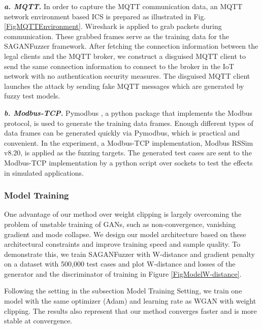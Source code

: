 \quad \textit{\textbf{a. MQTT.}}
In order to capture the MQTT communication data, an MQTT network environment based ICS is prepared as illustrated in Fig. \ref{FigMQTTEnvironment}. Wireshark \cite{orebaugh2006wireshark} is applied to grab packets during communication. These grabbed frames serve as the training data for the SAGANFuzzer framework. 
After fetching the connection information between the legal clients and the MQTT broker, we construct a disguised MQTT client to send the same connection information to connect to the broker in the IoT network with no authentication security measures. The disguised MQTT client launches the attack by sending fake MQTT messages which are generated by fuzzy test models. 

\quad \textit{\textbf{b. Modbus-TCP.}}
Pymodbus \cite{collins2013pymodbus}, a python package that implements the Modbus protocol, is used to generate the training data frames. Enough different types of data frames can be generated quickly via Pymodbus, which is practical and convenient. In the experiment, a Modbus-TCP implementation, Modbus RSSim v8.20, is applied as the fuzzing targets. The generated test cases are sent to the Modbus-TCP implementation by a python script over sockets to test the effects in simulated applications.


\subsubsection{Model Training}

One advantage of our method over weight clipping is largely overcoming the problem of unstable training of GANs, such as non-convergence, vanishing gradient and mode collapse. We design our model architecture based on these architectural constraints and improve training speed and sample quality. To demonstrate this, we train SAGANFuzzer with W-distance and gradient penalty on a dataset with 500,000 test cases and plot W-distance and losses of the generator and the discriminator of training in Figure \ref{FigModelW-distance}.



Following the setting in the subsection Model Training Setting, we train one model with the same optimizer (Adam) and learning rate as WGAN with weight clipping. The results also represent that our method converges faster and is more stable at convergence.

